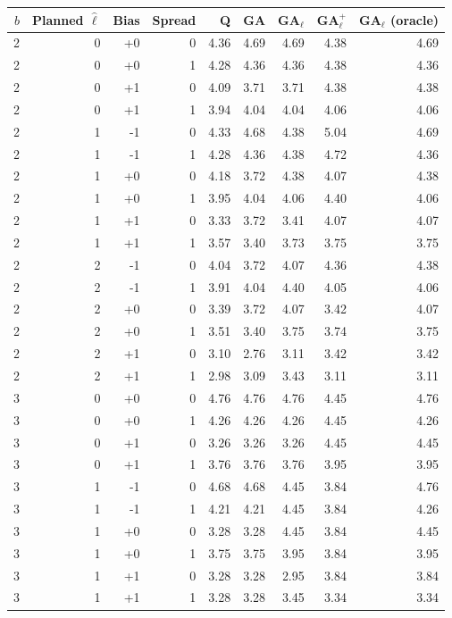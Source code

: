 \begin{tabular}{@{}rrrrrrrrr@{}}
\toprule
$b$ & Planned $\hat\ell$ & Bias & Spread & Q & GA & GA$_\ell$ & GA$_\ell^{+}$ & GA$_\ell$ (oracle) \\
\midrule
2 & 0 & +0 & 0 & 4.36 & 4.69 & 4.69 & 4.38 & 4.69 \\
2 & 0 & +0 & 1 & 4.28 & 4.36 & 4.36 & 4.38 & 4.36 \\
2 & 0 & +1 & 0 & 4.09 & 3.71 & 3.71 & 4.38 & 4.38 \\
2 & 0 & +1 & 1 & 3.94 & 4.04 & 4.04 & 4.06 & 4.06 \\
2 & 1 & -1 & 0 & 4.33 & 4.68 & 4.38 & 5.04 & 4.69 \\
2 & 1 & -1 & 1 & 4.28 & 4.36 & 4.38 & 4.72 & 4.36 \\
2 & 1 & +0 & 0 & 4.18 & 3.72 & 4.38 & 4.07 & 4.38 \\
2 & 1 & +0 & 1 & 3.95 & 4.04 & 4.06 & 4.40 & 4.06 \\
2 & 1 & +1 & 0 & 3.33 & 3.72 & 3.41 & 4.07 & 4.07 \\
2 & 1 & +1 & 1 & 3.57 & 3.40 & 3.73 & 3.75 & 3.75 \\
2 & 2 & -1 & 0 & 4.04 & 3.72 & 4.07 & 4.36 & 4.38 \\
2 & 2 & -1 & 1 & 3.91 & 4.04 & 4.40 & 4.05 & 4.06 \\
2 & 2 & +0 & 0 & 3.39 & 3.72 & 4.07 & 3.42 & 4.07 \\
2 & 2 & +0 & 1 & 3.51 & 3.40 & 3.75 & 3.74 & 3.75 \\
2 & 2 & +1 & 0 & 3.10 & 2.76 & 3.11 & 3.42 & 3.42 \\
2 & 2 & +1 & 1 & 2.98 & 3.09 & 3.43 & 3.11 & 3.11 \\
3 & 0 & +0 & 0 & 4.76 & 4.76 & 4.76 & 4.45 & 4.76 \\
3 & 0 & +0 & 1 & 4.26 & 4.26 & 4.26 & 4.45 & 4.26 \\
3 & 0 & +1 & 0 & 3.26 & 3.26 & 3.26 & 4.45 & 4.45 \\
3 & 0 & +1 & 1 & 3.76 & 3.76 & 3.76 & 3.95 & 3.95 \\
3 & 1 & -1 & 0 & 4.68 & 4.68 & 4.45 & 3.84 & 4.76 \\
3 & 1 & -1 & 1 & 4.21 & 4.21 & 4.45 & 3.84 & 4.26 \\
3 & 1 & +0 & 0 & 3.28 & 3.28 & 4.45 & 3.84 & 4.45 \\
3 & 1 & +0 & 1 & 3.75 & 3.75 & 3.95 & 3.84 & 3.95 \\
3 & 1 & +1 & 0 & 3.28 & 3.28 & 2.95 & 3.84 & 3.84 \\
3 & 1 & +1 & 1 & 3.28 & 3.28 & 3.45 & 3.34 & 3.34 \\

\end{tabular}
